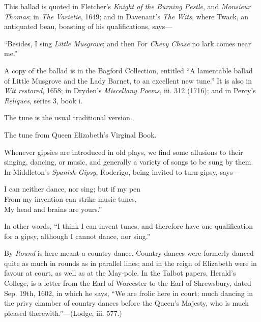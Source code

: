 
This ballad is quoted in Fletcher’s \textit{Knight of the Burning Pestle}, and \textit{Monsieur
Thomas}; in \textit{The Varietie}, 1649; and in Davenant’s \textit{The Wits}, where Twack, an
antiquated beau, boasting of his qualifications, says—

“Besides, I sing \textit{Little Musgrove}; and then
For \textit{Chevy Chase} no lark comes near me.”

A copy of the ballad is in the Bagford Collection, entitled “A lamentable
ballad of Little Musgrove and the Lady Barnet, to an excellent new tune.” It is
also in \textit{Wit restored}, 1658; in Dryden’s \textit{Miscellany Poems}, iii. 312 (1716); and
in Percy’s \textit{Reliques}, series 3, book i.

The tune is the usual traditional version.



\pagebreak


The tune from Queen Elizabeth’s Virginal Book.

Whenever gipsies are introduced in old plays, we find some allusions to their
singing, dancing, or music, and generally a variety of songs to be sung by them.
In Middleton’s \textit{Spanish Gipsy}, Roderigo, being invited to turn gipsy, says—
\settowidth{\versewidth}{I can neither dance, nor sing; but if my pen}
\begin{scverse}
I can neither dance, nor sing; but if my pen\\
From my invention can strike music tunes,\\
My head and brains are yours.”
\end{scverse}
In other words, “I think I can invent tunes, and therefore have one qualification
for a gipsy, although I cannot dance, nor sing.”

By \textit{Round} is here meant a country dance. Country dances were formerly danced
quite as much in rounds as in parallel lines; and in the reign of Elizabeth were
in favour at court, as well as at the May-pole. In the Talbot papers, Herald’s
College, is a letter from the Earl of Worcester to the Earl of Shrewsbury, dated
Sep. 19th, 1602, in which he says, “We are frolic here in court; much dancing
in the privy chamber of country dances before the Queen’s Majesty, who is
much pleased therewith.”—(Lodge, iii. 577.)

